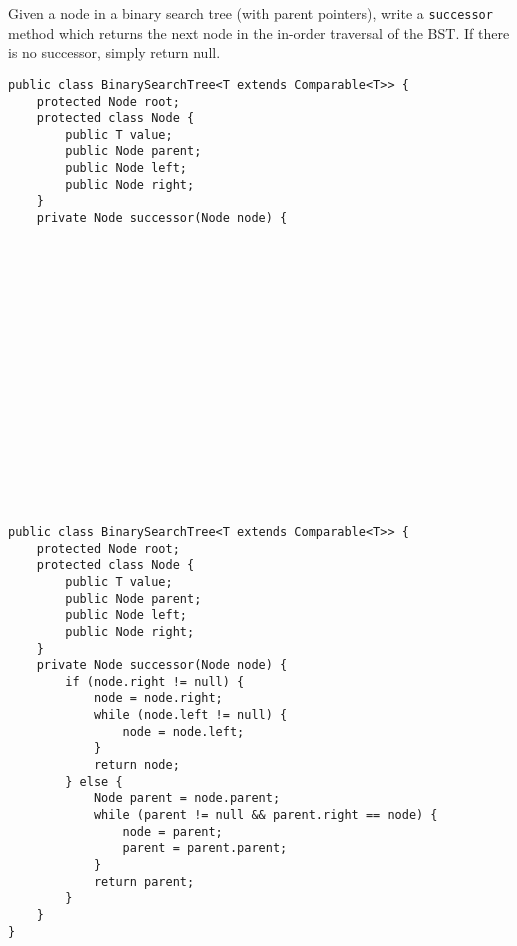 \question Given a node in a binary search tree (with parent pointers), write a \texttt{successor} method which returns the next node in the in-order traversal of the BST. If there is no successor, simply return null.

\ifprintanswers
\else
\begin{lstlisting}
public class BinarySearchTree<T extends Comparable<T>> {
    protected Node root;
    protected class Node {
        public T value;
        public Node parent;
        public Node left;
        public Node right;
    }
    private Node successor(Node node) {


















\end{lstlisting}
\fi

\begin{solution}
\begin{lstlisting}
public class BinarySearchTree<T extends Comparable<T>> {
    protected Node root;
    protected class Node {
        public T value;
        public Node parent;
        public Node left;
        public Node right;
    }
    private Node successor(Node node) {
        if (node.right != null) {
            node = node.right;
            while (node.left != null) {
                node = node.left;
            }
            return node;
        } else {
            Node parent = node.parent;
            while (parent != null && parent.right == node) {
                node = parent;
                parent = parent.parent;
            }
            return parent;
        }
    }
}
\end{lstlisting}
\end{solution}
